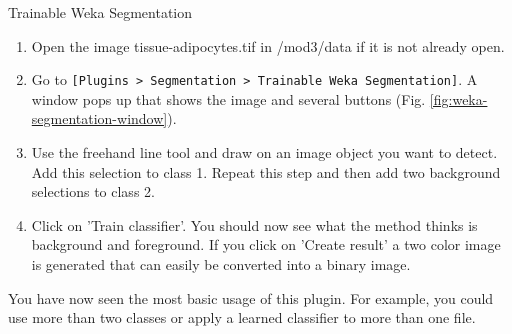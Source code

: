 \begin{taskbox}{Trainable Weka Segmentation}
\begin{enumerate}
	\item Open the image tissue-adipocytes.tif in /mod3/data if it is not already open.
	\item Go to \texttt{[Plugins > Segmentation > Trainable Weka Segmentation]}. A window pops up that shows the image and several buttons (Fig. \ref{fig:weka-segmentation-window}).
	
	\begin{minipage}[t]{\linewidth}
		\begin{center}
		\medskip
		\label{fig:weka-segmentation-window}
		\end{center}
	\end{minipage}
	
	\item Use the freehand line tool and draw on an image object you want to detect. Add this selection to class 1. Repeat this step and then add two background selections to class 2. 
	\item Click on 'Train classifier'. You should now see what the method thinks is background and foreground. If you click on 'Create result' a two color image is generated that can easily be converted into a binary image.
	
\end{enumerate}

You have now seen the most basic usage of this plugin. For example, you could use more than two classes or apply a learned classifier to more than one file.
\end{taskbox}
